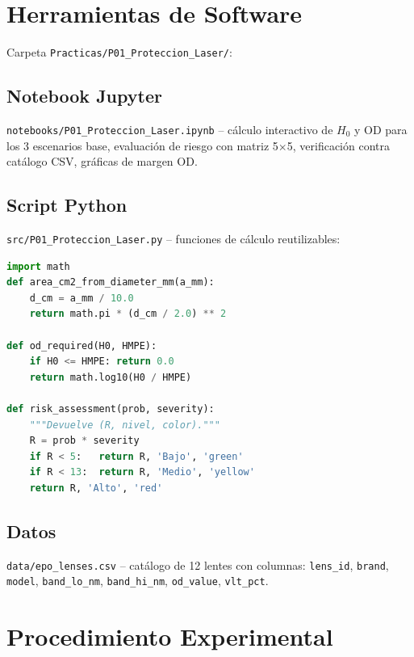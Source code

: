 \documentclass[12pt,a4paper]{article}
\begin{document}
\section{Herramientas de Software}
\label{sec:software}

Carpeta \texttt{Practicas/P01\_Proteccion\_Laser/}:

\subsection{Notebook Jupyter}
\texttt{notebooks/P01\_Proteccion\_Laser.ipynb} -- cálculo interactivo de $H_0$
y OD para los 3 escenarios base, evaluación de riesgo con matriz 5$\times$5,
verificación contra catálogo CSV, gráficas de margen OD.

\subsection{Script Python}
\texttt{src/P01\_Proteccion\_Laser.py} -- funciones de cálculo reutilizables:

\begin{lstlisting}[language=Python, caption={Funciones principales.}]
import math
def area_cm2_from_diameter_mm(a_mm):
    d_cm = a_mm / 10.0
    return math.pi * (d_cm / 2.0) ** 2

def od_required(H0, HMPE):
    if H0 <= HMPE: return 0.0
    return math.log10(H0 / HMPE)

def risk_assessment(prob, severity):
    """Devuelve (R, nivel, color)."""
    R = prob * severity
    if R < 5:   return R, 'Bajo', 'green'
    if R < 13:  return R, 'Medio', 'yellow'
    return R, 'Alto', 'red'
\end{lstlisting}

\subsection{Datos}
\texttt{data/epo\_lenses.csv} -- catálogo de 12 lentes con columnas:
\texttt{lens\_id}, \texttt{brand}, \texttt{model}, \texttt{band\_lo\_nm},
\texttt{band\_hi\_nm}, \texttt{od\_value}, \texttt{vlt\_pct}.

\section{Procedimiento Experimental}
\label{sec:procedimiento}
\end{document}
